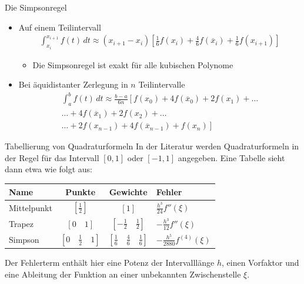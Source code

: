 \begin{frame}{Die Simpsonregel}
    \begin{itemize}
        \item Auf einem Teilintervall
        \begin{gather*}
            \int_{x_i}^{x_{i+1}} f(t)\,dt \approx (x_{i+1}-x_i)
            \left[
        \tfrac16 f(x_i) + \tfrac46 f(\overline x_i) + \tfrac16 f(x_{i+1})
        \right]
        \end{gather*}
        \begin{itemize}
            \item Die Simpsonregel ist exakt für alle kubischen Polynome
        \end{itemize}
        \item Bei äquidistanter Zerlegung in $n$ Teilintervalle
        \begin{multline*}
            \int_a^b f(t)\,dt \approx \frac{b-a}{6n}
            \left[f(x_0) + 4f(\overline x_0) + 2f(x_1)\right.
            + \dots \\ \dots
             + 4f(\overline x_1)+ 2f(x_2) + \dots\\
             \left.\dots + 2f(x_{n-1}) + 4f(\overline x_{n-1}) + f(x_{n})\right]
    \end{multline*}
\end{itemize}
\end{frame}

\begin{frame}{Tabellierung von Quadraturformeln}
In der Literatur werden Quadraturformeln in der Regel für das Intervall $[0,1]$ oder $[-1,1]$ angegeben. Eine Tabelle sieht dann etwa wie folgt aus:
\begin{center}
    \begin{tabular}{|l|c|c|l|}
    \hline
    Name & Punkte & Gewichte & Fehler
    \\\hline
        \vphantom{$\displaystyle\int$}Mittelpunkt & $\left[\frac12\right]$ & $\left[1\right]$
        & $\tfrac{h^3}{24} f''(\xi)$\\
        \vphantom{$\displaystyle\int$}Trapez & $\left[0\quad1\right]$ & $\left[-\tfrac12\quad\tfrac12\right]$
        & $-\tfrac{h^3}{12} f''(\xi)$\\
        \vphantom{$\displaystyle\int$}Simpson & $\left[0\quad\tfrac12\quad1\right]$ & $\left[\tfrac16\quad\tfrac46\quad\tfrac16\right]$
        & $-\tfrac{h^5}{2880} f^{(4)}(\xi)$\\
        \hline
    \end{tabular}
\end{center}
    Der Fehlerterm enthält hier eine Potenz der Intervalllänge $h$, einen Vorfaktor und eine Ableitung der Funktion an einer unbekannten Zwischenstelle $\xi$.
\end{frame}

